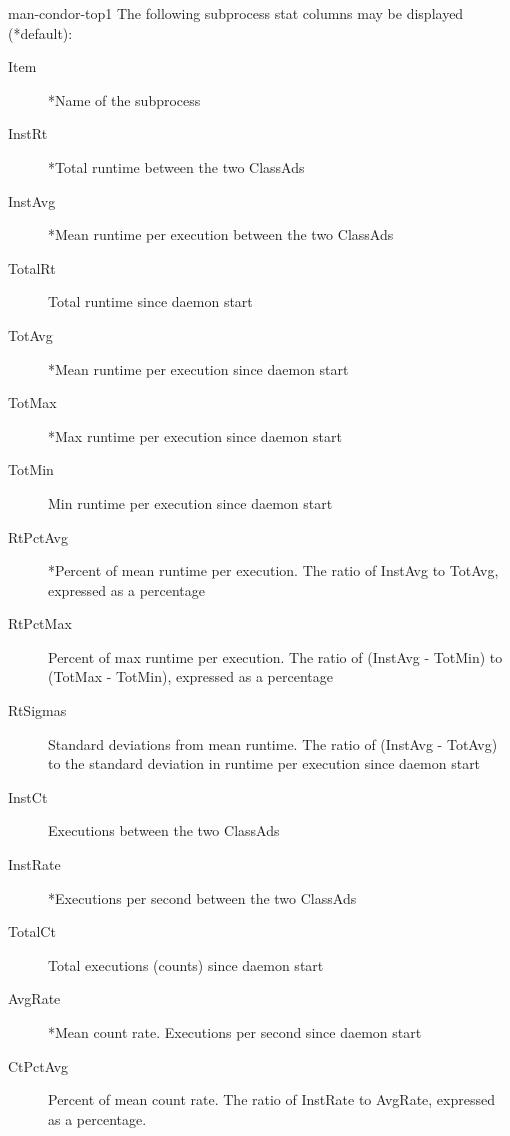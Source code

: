 \begin{ManPage}{}{man-condor-top}{1}
The following subprocess stat columns may be displayed (*default):
\begin{description}
\item[Item]{*Name of the subprocess}
\item[InstRt]{*Total runtime between the two ClassAds}
\item[InstAvg]{*Mean runtime per execution between the two ClassAds}
\item[TotalRt]{Total runtime since daemon start}
\item[TotAvg]{*Mean runtime per execution since daemon start}
\item[TotMax]{*Max runtime per execution since daemon start}
\item[TotMin]{Min runtime per execution since daemon start}
\item[RtPctAvg]{*Percent of mean runtime per execution. The ratio of InstAvg to TotAvg, expressed as a percentage}
\item[RtPctMax]{Percent of max runtime per execution. The ratio of (InstAvg - TotMin) to (TotMax - TotMin), expressed as a percentage}
\item[RtSigmas]{Standard deviations from mean runtime. The ratio of (InstAvg - TotAvg) to the standard deviation in runtime per execution since daemon start}
\item[InstCt]{Executions between the two ClassAds}
\item[InstRate]{*Executions per second between the two ClassAds}
\item[TotalCt]{Total executions (counts) since daemon start}
\item[AvgRate]{*Mean count rate. Executions per second since daemon start}
\item[CtPctAvg]{Percent of mean count rate. The ratio of InstRate to AvgRate, expressed as a percentage.}
\end{description}

\begin{Options}


\end{Options}
\end{ManPage}
